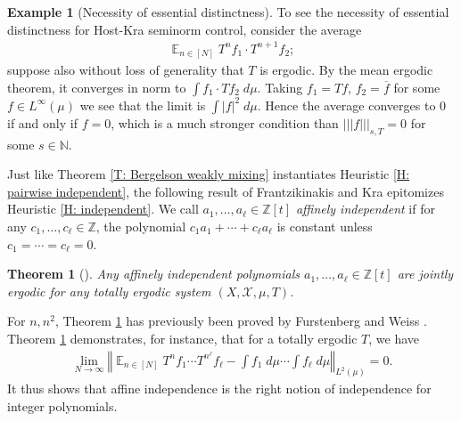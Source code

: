 \documentclass[11pt]{amsart}
\newtheorem{theorem}[lemma]{Theorem}
\theoremstyle{definition}
\newtheorem{example}[lemma]{Example}
\DeclareMathOperator*{\E}{\mathbb{E}}
\newcommand{\N}{{\mathbb N}}
\newcommand{\Z}{{\mathbb Z}}
\newcommand{\CX}{{\mathcal X}}
\newcommand{\norm}[1]{\left\Vert #1\right\Vert}
\newcommand{\nnorm}[1]{\lvert\!|\!| #1|\!|\!\rvert}
\newcommand{\1}{{\mathbf{1}}}
\begin{document}
\begin{example}[Necessity of essential distinctness]
    To see the necessity of essential distinctness for Host-Kra seminorm control, consider the average
    \begin{align*}
        \E_{n\in[N]}T^n f_1\cdot T^{n+1}f_2;
    \end{align*}
    suppose also without loss of generality that $T$ is ergodic.
    By the mean ergodic theorem, it converges in norm to $\int f_1\cdot Tf_2\; d\mu$. Taking $f_1 = Tf$, $f_2 = \overline{f}$ for some $f\in L^\infty(\mu)$ we see that the limit is $\int |f|^2\; d\mu$. Hence the average converges to 0 if and only if $f = 0$, which is a much stronger condition than $\nnorm{f}_{s, T} = 0$ for some $s\in\N$.
\end{example}

Just like Theorem \ref{T: Bergelson weakly mixing} instantiates Heuristic \ref{H: pairwise independent}, the following result of Frantzikinakis and Kra epitomizes Heuristic \ref{H: independent}. We call $a_1, \ldots, a_\ell\in\Z[t]$ \emph{affinely independent} if for any $c_1, \ldots, c_\ell\in\Z$, the polynomial $c_1 a_1 + \cdots + c_\ell a_\ell$ is constant unless $c_1 = \cdots = c_\ell = 0$.
\begin{theorem}%
[{\cite[Theorem 1.1]{FrKr05}}]\label{T: FrKr affine independence totally ergodic}
    Any affinely independent polynomials $a_1, \ldots, a_\ell\in\Z[t]$ are jointly ergodic for any totally ergodic system $(X, \CX, \mu, T)$.
\end{theorem}
For $n, n^2$, Theorem \ref{T: FrKr affine independence totally ergodic} has previously been proved by Furstenberg and Weiss \cite{FW96}. 
Theorem \ref{T: FrKr affine independence totally ergodic} demonstrates, for instance, that for a totally ergodic $T$, we have
\begin{align*}
    \lim_{N\to\infty}\norm{\E_{n\in[N]}T^n f_1 \cdots T^{n^\ell}f_\ell - \int f_1\; d\mu\cdots \int f_\ell\; d\mu}_{L^2(\mu)} = 0.
\end{align*}
It thus shows that affine independence is the right notion of independence for integer polynomials. 
\end{document}
